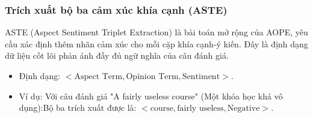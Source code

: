 \documentclass[12pt,a4paper]{report}
\begin{document}
\subsubsection{Trích xuất bộ ba cảm xúc khía cạnh (ASTE)}ASTE (Aspect Sentiment Triplet Extraction) là bài toán mở rộng của AOPE, yêu cầu xác định thêm nhãn cảm xúc cho mỗi cặp khía cạnh-ý kiến. Đây là định dạng dữ liệu cốt lõi phản ánh đầy đủ ngữ nghĩa của câu đánh giá.\begin{itemize}\item Định dạng: $< \text{Aspect Term}, \text{Opinion Term}, \text{Sentiment} >$.\item Ví dụ: Với câu đánh giá "A fairly useless course" (Một khóa học khá vô dụng):Bộ ba trích xuất được là: $< \text{course}, \text{fairly useless}, \text{Negative} >$.\end{itemize}











\end{document}

